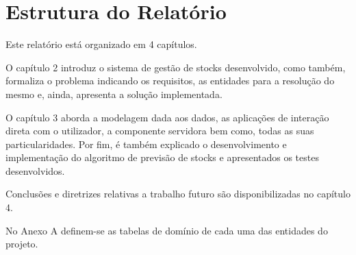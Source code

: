 %
%
\section{Estrutura do Relatório} \label{sec14}
Este relatório está organizado em 4 capítulos.

O capítulo 2 introduz o sistema de gestão de stocks desenvolvido, como também, formaliza o problema indicando os requisitos, as entidades para a resolução do mesmo e, ainda, apresenta a solução implementada.

O capítulo 3 aborda a modelagem dada aos dados, as aplicações de interação direta com o utilizador, a componente servidora bem como, todas as suas particularidades. Por fim, é também explicado o desenvolvimento e implementação do algoritmo de previsão de stocks e apresentados os testes desenvolvidos.

Conclusões e diretrizes relativas a trabalho futuro são disponibilizadas no capítulo 4.

No Anexo A definem-se as tabelas de domínio de cada uma das entidades do projeto.
